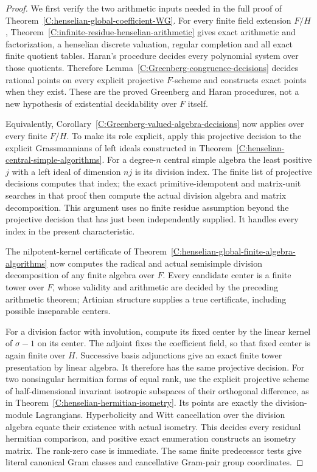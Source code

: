 \begin{proof}
We first verify the two arithmetic
inputs needed in the full proof
of Theorem~\ref{C:henselian-global-coefficient-WG}.
For every finite field extension
$F/H$, Theorem~\ref{C:infinite-residue-henselian-arithmetic}
gives exact arithmetic and factorization,
a henselian discrete valuation,
regular completion and all exact
finite quotient tables.
Haran's procedure decides every
polynomial system over those
quotients.  Therefore
Lemma~\ref{C:Greenberg-congruence-decisions}
decides rational points on every
explicit projective $F$-scheme
and constructs exact points
when they exist.
These are the proved Greenberg
and Haran procedures, not a
new hypothesis of existential
decidability over $F$ itself.

Equivalently,
Corollary~\ref{C:Greenberg-valued-algebra-decisions}
now applies over every finite $F/H$.
To make its role explicit, apply
this projective decision
to the explicit Grassmannians
of left ideals constructed in
Theorem~\ref{C:henselian-central-simple-algorithms}.
For a degree-$n$ central simple
algebra the least positive $j$
with a left ideal of dimension
$nj$ is its division index.
The finite list of projective
decisions computes that index;
the exact primitive-idempotent
and matrix-unit searches in
that proof then compute the
actual division algebra and
matrix decomposition.
This argument uses no finite
residue assumption beyond the
projective decision that has
just been independently supplied.
It handles every index in
the present characteristic.

The nilpotent-kernel certificate
of Theorem~\ref{C:henselian-global-finite-algebra-algorithms}
now computes the radical and
actual semisimple division
decomposition of any finite
algebra over $F$.
Every candidate center is a
finite tower over $F$, whose
validity and arithmetic are
decided by the preceding
arithmetic theorem; Artinian
structure supplies a true
certificate, including possible
inseparable centers.

For a division factor with
involution, compute its fixed
center by the linear kernel
of $\sigma-1$ on its center.
The adjoint fixes the coefficient
field, so that fixed center is
again finite over $H$.
Successive basis adjunctions
give an exact finite tower
presentation by linear algebra.
It therefore has the same
projective decision.
For two nonsingular hermitian
forms of equal rank, use the
explicit projective scheme of
half-dimensional invariant
isotropic subspaces of their
orthogonal difference, as in
Theorem~\ref{C:henselian-hermitian-isometry}.
Its points are exactly the
division-module Lagrangians.
Hyperbolicity and Witt cancellation
over the division algebra
equate their existence with
actual isometry.
This decides every residual
hermitian comparison, and
positive exact enumeration
constructs an isometry matrix.
The rank-zero case is immediate.
The same finite predecessor
tests give literal canonical
Gram classes and cancellative
Gram-pair group coordinates.


\end{proof}
